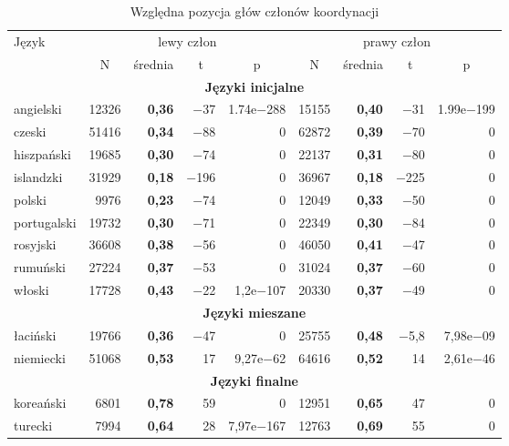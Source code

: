 \begin{table}[H]
\centering
\begin{tabular}{lrrrrrrrr}
  \toprule
Język & \multicolumn{4}{c}{lewy człon} & \multicolumn{4}{c}{prawy człon}\\
 & \multicolumn{1}{c}{N} & \multicolumn{1}{c}{średnia} & \multicolumn{1}{c}{t} & \multicolumn{1}{c}{p} & \multicolumn{1}{c}{N} & \multicolumn{1}{c}{średnia} & \multicolumn{1}{c}{t} & \multicolumn{1}{c}{p} \\ 
  \midrule
  \multicolumn{9}{c}{\textbf{Języki inicjalne}} \\
  \midrule
  angielski 	& 12326 	& \textbf{0,36} & $-$37 & 1.74e$-$288 & 15155 & \textbf{0,40} & $-$31 & 1.99e$-$199 \\
  czeski 	& 51416 	& \textbf{0,34} & $-$88 & 0 		& 62872 & \textbf{0,39} & $-$70 & 0 \\ 
  hiszpański	& 19685 & \textbf{0,30} & $-$74 & 0 		& 22137 & \textbf{0,31} & $-$80 & 0 \\ 
  islandzki 	& 31929 	& \textbf{0,18} & $-$196 & 0 		& 36967 & \textbf{0,18} & $-$225 & 0 \\ 
  polski 	& 9976 	& \textbf{0,23} & $-$74 & 0 		& 12049 & \textbf{0,33} & $-$50 & 0 \\ 
  portugalski & 19732 & \textbf{0,30} & $-$71 & 0 		& 22349 & \textbf{0,30} & $-$84 & 0 \\ 
  rosyjski 	& 36608 	& \textbf{0,38} & $-$56 & 0 		& 46050 & \textbf{0,41} & $-$47 & 0 \\ 
  rumuński 	& 27224 	& \textbf{0,37} & $-$53 & 0 		& 31024 & \textbf{0,37} & $-$60 & 0 \\ 
  włoski 	& 17728 	& \textbf{0,43} & $-$22 & 1,2e$-$107	& 20330 & \textbf{0,37} & $-$49 & 0 \\
  \midrule
  \multicolumn{9}{c}{\textbf{Języki mieszane}} \\
  \midrule
  łaciński 	& 19766 & \textbf{0,36}	& $-$47 & 0 		& 25755 & \textbf{0,48} & $-$5,8 & 7,98e$-$09 \\
  niemiecki & 51068 	& \textbf{0,53}	& 17 & 9,27e$-$62	& 64616 & \textbf{0,52} & 14 & 2,61e$-$46 \\ 
  \midrule
  \multicolumn{9}{c}{\textbf{Języki finalne}} \\
  \midrule
  koreański	& 6801 & \textbf{0,78} & 59 & 0 			& 12951 & \textbf{0,65} & 47 & 0 \\ 
  turecki 	& 7994 & \textbf{0,64} & 28 & 7,97e$-$167	& 12763 & \textbf{0,69} & 55 & 0 \\
  \bottomrule
\end{tabular}
\caption{Względna pozycja głów członów koordynacji}
\label{tab:pozycja-głowy}
\end{table}

